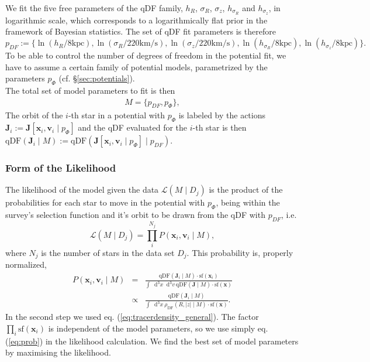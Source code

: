 \documentclass[12pt,preprint]{aastex}
\newcommand{\vect}[1]{\boldsymbol{#1}} %
\newcommand*\Diff[1]{\mathop{}\!\mathrm{d^#1}}
\begin{document}
We fit the five free parameters of the qDF family, $h_R$, $\sigma_R$, $\sigma_z$, $h_{\sigma_R}$ and $h_{\sigma_z}$, in logarithmic scale, which corresponds to a logarithmically flat prior in the framework of Bayesian statistics. The set of qDF fit parameters is therefore 
\begin{equation*}
p_{DF} := \{ \ln \left(h_R/8\text{kpc}\right), \ln \left(\sigma_R/220\text{km/s}\right), \ln \left(\sigma_z/220\text{km/s}\right), \ln \left(h_{\sigma_R}/8\text{kpc}\right), \ln \left(h_{\sigma_z}/8\text{kpc}\right)\} .
\end{equation*}
To be able to control the number of degrees of freedom in the potential fit, we have to assume a certain family of potential models, parametrized by the parameters $p_\Phi$ (cf. \S\ref{sec:potentials}). 
\\The total set of model parameters to fit is then
\begin{eqnarray*}
M =\{ p_{DF} , p_\Phi \},
\end{eqnarray*}
The orbit of the $i$-th star in a potential with $p_\Phi$ is labeled by the actions $\vect{J}_i := \vect{J}[\vect{x}_i,\vect{v}_i\mid p_{\Phi}]$ and the qDF evaluated for the $i$-th star is then $\text{qDF}(\vect{J}_i \mid M) := \text{qDF}(\vect{J}[\vect{x}_i,\vect{v}_i\mid p_{\Phi}] \mid p_{DF})$.

\subsubsection{Form of the Likelihood} 

The likelihood of the model given the data $\mathscr{L}(M \mid D_j)$ is the product of the probabilities for each star to move in the potential with $p_\Phi$, being within the survey's selection function and it's orbit to be drawn from the qDF with $p_{DF}$, i.e. 
\begin{equation}
\mathscr{L}(M \mid D_j) = \prod_i^{N_j} P(\vect{x}_i,\vect{v}_i \mid M), \label{eq:likelihood}
\end{equation}
where $N_j$ is the number of stars in the data set $D_j$. This probability is, properly normalized,
\begin{eqnarray}
P(\vect{x}_i,\vect{v}_i \mid M) &=& \frac{\text{qDF}(\vect{J}_i \mid M) \cdot \text{sf}(\vect{x}_i)}{\int \Diff 3 x \Diff 3 v \  \text{qDF}(\vect{J} \mid M) \cdot \text{sf}(\vect{x})}\nonumber\\
&\propto&  \frac{\text{qDF}(\vect{J}_i \mid M)}{\int \Diff 3 x \  \rho_\text{DF}(R,|z| \mid M) \cdot \text{sf}(\vect{x})}. \label{eq:prob}
\end{eqnarray}
In the second step we used eq. (\ref{eq:tracerdensity_general}). The factor $\prod_i\text{sf}(\vect{x}_i)$ is independent of the model parameters, so we use simply eq. (\ref{eq:prob}) in the likelihood calculation. We find the best set of model parameters by maximising the likelihood.
\end{document}
